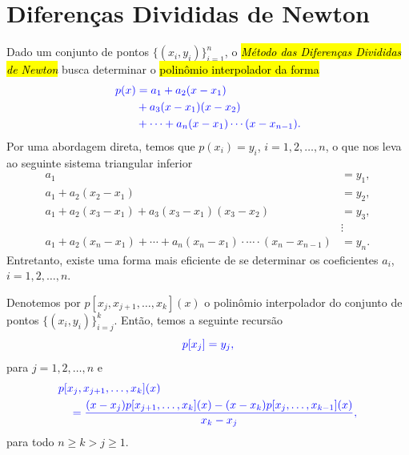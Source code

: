 
\section{Diferenças Divididas de Newton}\label{cap_interp_sec_difdiv}

Dado um conjunto de pontos $\{(x_i, y_i)\}_{i=1}^n$, o \hl{\emph{Método das Diferenças Divididas de Newton}}{\newton} busca determinar o \hl{polinômio interpolador da forma}
\begin{equation}\color{blue}\begin{aligned}
    p(x) &= a_1 + a_2(x-x_1) \\
    &+ a_3(x-x_1)(x-x_2)\\
    &+ \cdots + a_{n}(x-x_1) \cdots (x-x_{n-1}).
  \end{aligned}
\end{equation}
Por uma abordagem direta, temos que $p(x_i)=y_i$, $i=1, 2, \dotsc, n$, o que nos leva ao seguinte sistema triangular inferior
\begin{subequations}
  \begin{align}
    a_1 &= y_1, \\
    a_1 + a_2(x_2-x_1) &= y_2, \\
    a_1 + a_2(x_3-x_1) + a_3(x_3-x_1)(x_3-x_2) &= y_3, \\
        &\vdots\\
    a_1 + a_2(x_n-x_1) + \cdots + a_{n}(x_n-x_1)\cdot\cdots\cdot(x_n-x_{n-1}) &= y_n.
  \end{align}
\end{subequations}
Entretanto, existe uma forma mais eficiente de se determinar os coeficientes $a_i$, $i=1, 2, \dotsc, n$.

Denotemos por $p[x_j, x_{j+1}, \dotsc, x_{k}](x)$ o polinômio interpolador do conjunto de pontos $\{(x_i, y_i)\}_{i=j}^k$. Então, temos a seguinte recursão
\begin{equation}\label{cap_interp_sec_difdiv:eq:interp_parc1}\color{blue}p[x_j] = y_j,
\end{equation}
para $j=1, 2, \dotsc, n$ e
\begin{equation}\label{cap_interp_sec_difdiv:eq:interp_parc2}\color{blue}\begin{aligned}
    &p[x_j, x_{j+1}, \ldots, x_k](x)\\
    &\quad = \frac{(x-x_j)p[x_{j+1},\dotsc,x_k](x)-(x-x_k)p[x_j,\dotsc,x_{k-1}](x)}{x_k-x_j},
  \end{aligned}
\end{equation}
para todo $n\geq k > j \geq 1$.

